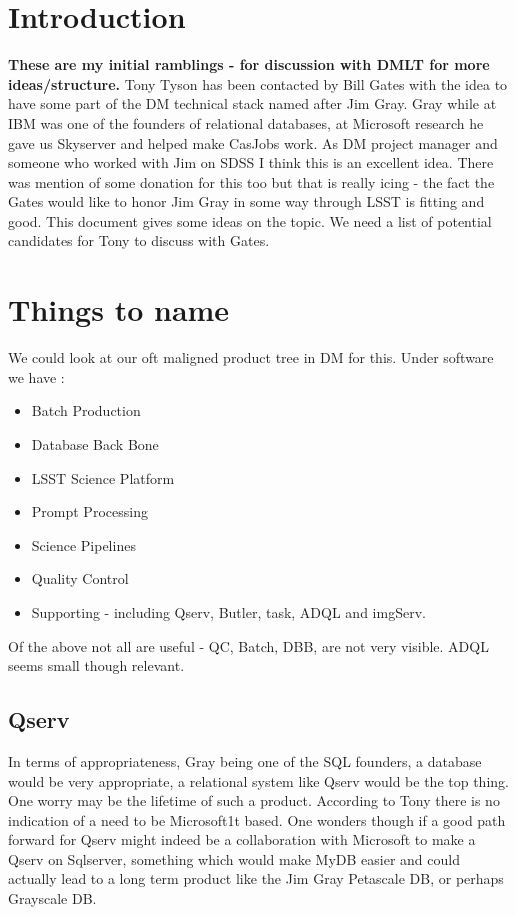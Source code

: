 \section{Introduction}
{\bf These are my initial ramblings - for discussion with DMLT for more ideas/structure.}
Tony Tyson has been contacted by Bill Gates with the idea to have some part of the DM technical stack named
after Jim Gray.  Gray while at IBM was one of the founders of relational databases, at Microsoft research he gave us
Skyserver and helped make CasJobs work.
As DM project manager and someone who worked with Jim on SDSS I think this is an excellent idea.  There was mention of some donation for this too but that is really icing - the fact the Gates would like to honor Jim Gray in some way through LSST is fitting and good. This document gives some ideas on the topic. We need a list of potential candidates for Tony to discuss with Gates.

\section{Things to name}

We could look at our oft maligned product tree in DM for this. Under software we have :
\begin{itemize}
\item Batch Production
\item Database Back Bone
\item LSST Science Platform
\item Prompt Processing
\item Science Pipelines
\item Quality Control
\item Supporting - including Qserv, Butler, task, ADQL and imgServ.
\end{itemize}

Of the above not all are useful - QC, Batch, DBB, are not very visible. ADQL seems small though relevant.
\subsection{Qserv }
In terms of appropriateness, Gray being one of the SQL founders, a database would be very appropriate, a relational
system like Qserv would be the top thing. One worry may be the lifetime of such a product. According to Tony there is no
indication of a need to be Microsoft1t based. One wonders though if a good path forward for Qserv might indeed be a collaboration with Microsoft to make a Qserv on Sqlserver, something which would make MyDB easier and could actually lead to a long term product like the Jim Gray Petascale DB, or perhaps Grayscale DB.

